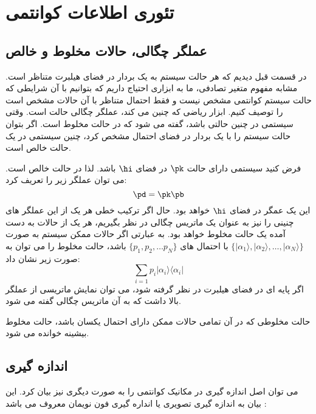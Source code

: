 \section{تئوری اطلاعات کوانتمی}

\subsection{عملگر چگالی، حالات مخلوط و خالص}
در قسمت قبل دیدیم که هر حالت سیستم به یک بردار در فضای هیلبرت متناظر است. 
مشابه مفهوم متغیر تصادفی، ما به ابزاری احتیاج داریم که بتوانیم با آن شرایطی که حالت سیستم کوانتمی مشخص نیست و فقط احتمال متناظر با آن حالات مشخص است را توصیف کنیم. ابزار ریاضی که چنین می کند، عملگر چگالی 
حالت است. وقتی سیستمی در چنین حالتی باشد، گفته می شود که در حالت مخلوط است. اگر بتوان حالت سیستم را با یک بردار در فضای احتمال مشخص کرد، چنین سیستمی در یک حالت خالص است.

فرض کنید سیستمی دارای حالت
$\pk$
در فضای 
$\hi$
باشد. لذا در حالت خالص است. می توان عملگر زیر را تعریف کرد:
\begin{equation}
		\pd = \pk \pb
\end{equation}
این یک عمگر در فضای
$\hi$
خواهد بود. حال اگر ترکیب خطی هر یک از این عملگر های چنینی را نیز به عنوان یک ماتریس چگالی در نظر بگیریم، هر یک از حالات به دست آمده یک حالت مخلوط خواهد بود. به عبارتی اگر حالات ممکن سیستم به صورت
$\{ |\alpha_1 \rangle, |\alpha_2 \rangle, \ldots , |\alpha_N \rangle \}$
با احتمال های
$\{p_1,p_2,\ldots p_N\}$
باشد، حالت مخلوط را می توان به صورت زیر نشان داد:
\begin{equation}
	\sum_{i=1} p_i |\alpha_i \rangle \langle \alpha_i  |
\end{equation}
اگر پایه ای در فضای هیلبرت در نظر گرفته شود، می توان نمایش ماتریسی از عملگر بالا داشت که به آن ماتریس چگالی
گفته می شود.

حالت مخلوطی که در آن تمامی حالات ممکن دارای احتمال یکسان باشد، حالت مخلوط بیشینه 
خوانده می شود.

\subsection{اندازه گیری }
می توان اصل اندازه گیری در مکانیک کوانتمی را به صورت دیگری نیز بیان کرد. این بیان به اندازه گیری تصویری
یا انداره گیری فون نویمان 
معروف می باشد
\cite{chuang}
:

